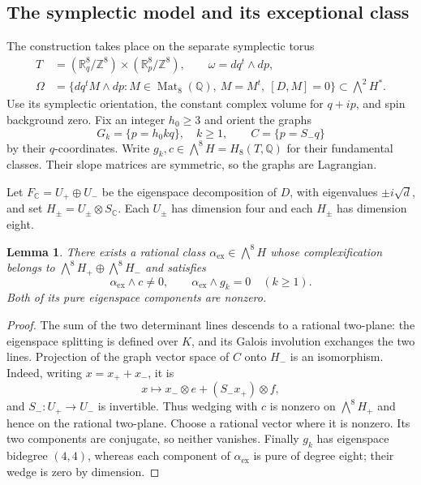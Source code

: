 \documentclass[11pt]{article}
\newtheorem{lemma}[theorem]{Lemma}
\theoremstyle{definition}
\theoremstyle{remark}
\newcommand{\Q}{\mathbb Q}
\newcommand{\R}{\mathbb R}
\newcommand{\C}{\mathbb C}
\newcommand{\Z}{\mathbb Z}
\numberwithin{equation}{section}
\begin{document}
\subsection{The symplectic model and its exceptional class}

The construction takes place on the separate symplectic torus
\begin{equation}
 \begin{split}
 T&=(\R^8_q/\Z^8)\times(\R^8_p/\Z^8),\qquad
       \omega=dq^t\wedge dp,\\
 \Omega&=\{dq^tM\wedge dp:M\in\operatorname{Mat}_8(\Q),\
                    M=M^t,\ [D,M]=0\}
       \subset\bigwedge^2H^*.
 \end{split}
 \label{hodge:omega-space}
\end{equation}
Use its symplectic orientation, the constant complex volume for $q+ip$,
and spin background zero.  Fix an integer $h_0\ge3$ and orient the graphs
\begin{equation}
 G_k=\{p=h_0kq\},\quad k\ge1,\qquad C=\{p=S_-q\}
 \label{hodge:graph-classes}
\end{equation}
by their $q$-coordinates.  Write $g_k,c\in\bigwedge^8H=H_8(T,\Q)$
for their fundamental classes.  Their slope matrices are symmetric, so
the graphs are Lagrangian.

Let $F_\C=U_+\oplus U_-$ be the eigenspace decomposition of $D$, with
eigenvalues $\pm i\sqrt d$, and set $H_\pm=U_\pm\otimes S_\C$.
Each $U_\pm$ has dimension four and each $H_\pm$ has dimension eight.

\begin{lemma}
\label{hodge:exceptional-homology}
There exists a rational class $\alpha_{\mathrm{ex}}\in\bigwedge^8H$
whose complexification belongs to
$\bigwedge^8H_+\oplus\bigwedge^8H_-$ and satisfies
\begin{equation}
 \alpha_{\mathrm{ex}}\wedge c\ne0,
 \qquad \alpha_{\mathrm{ex}}\wedge g_k=0\quad(k\ge1).
 \label{hodge:exceptional-pairings}
\end{equation}
Both of its pure eigenspace components are nonzero.
\end{lemma}

\begin{proof}
The sum of the two determinant lines descends to a rational two-plane:
the eigenspace splitting is defined over $K$, and its Galois involution
exchanges the two lines.  Projection of the graph vector space of $C$
onto $H_-$ is an isomorphism.  Indeed, writing $x=x_++x_-$, it is
\[
 x\longmapsto x_-\otimes e+(S_-x_+)\otimes f,
\]
and $S_-:U_+\to U_-$ is invertible.  Thus wedging with $c$ is nonzero
on $\bigwedge^8H_+$ and hence on the rational two-plane.  Choose a rational
vector where it is nonzero.  Its two components are conjugate, so neither
vanishes.  Finally $g_k$ has eigenspace bidegree $(4,4)$, whereas each
component of $\alpha_{\mathrm{ex}}$ is pure of degree eight; their wedge
is zero by dimension.
\end{proof}
\end{document}

